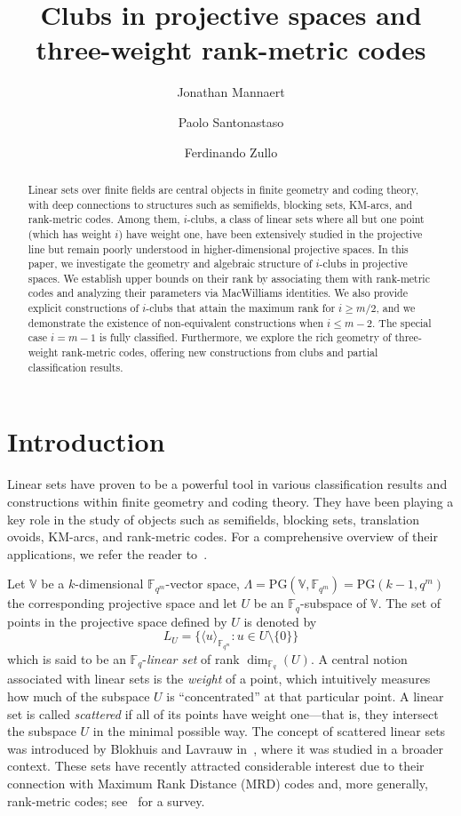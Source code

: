 \documentclass[11pt]{amsart}
\title{Clubs in projective spaces and three-weight rank-metric codes}
\date{}
\author[J. Mannaert]{Jonathan Mannaert}
\author[P. Santonastaso]{Paolo Santonastaso}
\author[F. Zullo]{Ferdinando Zullo}
\theoremstyle{definition}
\newcommand{\fq}{{\mathbb F}_{q}}
\newcommand{\PG}{\mathrm{PG}}
\newcommand{\fqm}{\mathbb{F}_{q^m}}
\begin{document}
\begin{abstract}
Linear sets over finite fields are central objects in finite geometry and coding theory, with deep connections to structures such as semifields, blocking sets, KM-arcs, and rank-metric codes. Among them, $i$-clubs, a class of linear sets where all but one point (which has weight $i$) have weight one, have been extensively studied in the projective line but remain poorly understood in higher-dimensional projective spaces.
In this paper, we investigate the geometry and algebraic structure of $i$-clubs in projective spaces. We establish upper bounds on their rank by associating them with rank-metric codes and analyzing their parameters via MacWilliams identities. We also provide explicit constructions of $i$-clubs that attain the maximum rank for $i \geq m/2$, and we demonstrate the existence of non-equivalent constructions when $i \leq m-2$. The special case $i = m-1$ is fully classified. Furthermore, we explore the rich geometry of three-weight rank-metric codes, offering new constructions from clubs and partial classification results.
\end{abstract}

\maketitle


\section{Introduction}

Linear sets have proven to be a powerful tool in various classification results and constructions within finite geometry and coding theory. They have been playing a key role in the study of objects such as semifields, blocking sets, translation ovoids, KM-arcs, and rank-metric codes. For a comprehensive overview of their applications, we refer the reader to~\cite{lavrauw2015field,polverino2010linear}.

Let $\mathbb{V}$ be a $k$-dimensional $\fqm$-vector space, $\Lambda=\PG(\mathbb{V},\fqm)=\PG(k-1,q^m)$ the corresponding projective space and let $U$ be an $\fq$-subspace of $\mathbb{V}$. 
The set of points in the projective space defined by $U$ is denoted by
\[ L_U=\{\langle {u} \rangle_{\fqm} \colon {u}\in U\setminus\{{0}\}\} \]
which is said to be an $\fq$-\emph{linear set} of rank $\dim_{\fq}(U)$.
A central notion associated with linear sets is the \emph{weight} of a point, which intuitively measures how much of the subspace $U$ is ``concentrated'' at that particular point. A linear set is called \emph{scattered} if all of its points have weight one---that is, they intersect the subspace $U$ in the minimal possible way. The concept of scattered linear sets was introduced by Blokhuis and Lavrauw in~\cite{blokhuis2000scattered}, where it was studied in a broader context. These sets have recently attracted considerable interest due to their connection with Maximum Rank Distance (MRD) codes and, more generally, rank-metric codes; see~\cite{polverino2020connections} for a survey.
\end{document}
